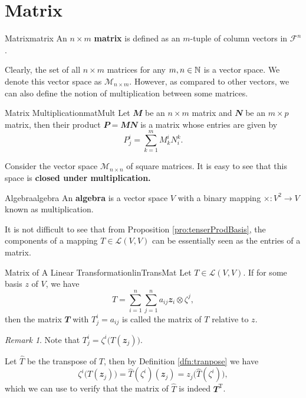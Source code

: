 \documentclass[math, code]{amznotes}
\theoremstyle{remark}
\newtheorem*{remark}{Remark}
\begin{document}
\section{Matrix}
\begin{dfnbox}{Matrix}{matrix}
    An $n \times m$ {\color{red} \textbf{matrix}} is defined as an $m$-tuple of column vectors in $\mathcal{F}^n$.
\end{dfnbox}
Clearly, the set of all $n \times m$ matrices for any $m, n \in \mathbb{N}$ is a vector space. We denote this vector space as $\mathcal{M}_{n \times m}$. However, as compared to other vectors, we can also define the notion of multiplication between some matrices.
\begin{dfnbox}{Matrix Multiplication}{matMult}
    Let $\mathbfit{M}$ be an $n \times m$ matrix and $\mathbfit{N}$ be an $m \times p$ matrix, then their product $\mathbfit{P = MN}$ is a matrix whose entries are given by
    \begin{equation*}
        P^i_j = \sum_{k = 1}^{m}M^i_kN^k_i.
    \end{equation*}
\end{dfnbox}
Consider the vector space $\mathcal{M}_{n \times n}$ of square matrices. It is easy to see that this space is \textbf{closed under multiplication.} 
\begin{dfnbox}{Algebra}{algebra}
    An {\color{red} \textbf{algebra}} is a vector space $V$ with a binary mapping $\times \colon V^2 \to V$ known as multiplication.
\end{dfnbox}
It is not difficult to see that from Proposition \ref{pro:tenserProdBasis}, the components of a mapping $T \in \mathcal{L}(V, V)$ can be essentially seen as the entries of a matrix.
\begin{dfnbox}{Matrix of A Linear Transformation}{linTransMat}
    Let $T \in \mathcal{L}(V, V)$. If for some basis $z$ of $V$, we have
    \begin{equation*}
        T = \sum_{i = 1}^{n}\sum_{j = 1}^{n}a_{ij}\mathbfit{z}_i \otimes \zeta^j,
    \end{equation*}
    then the matrix $\mathbfit{T}$ with $T^i_j = a_{ij}$ is called the matrix of $T$ relative to $z$.
\end{dfnbox}
\begin{notebox}
    \begin{remark}
        Note that $T^i_j = \zeta^i\bigl(T(\mathbfit{z}_j)\bigr)$.
    \end{remark}
\end{notebox}
Let $\hat{T}$ be the transpose of $T$, then by Definition \ref{dfn:tranpose} we have
\begin{equation*}
    \zeta^i\bigl(T(\mathbfit{z}_j)\bigr) = \hat{T}(\zeta^i)(\mathbfit{z}_j) = z_j\bigl(\hat{T}(\zeta^i)\bigr),
\end{equation*}
which we can use to verify that the matrix of $\hat{T}$ is indeed $\mathbfit{T}^{\mathrm{T}}$.
\end{document}
